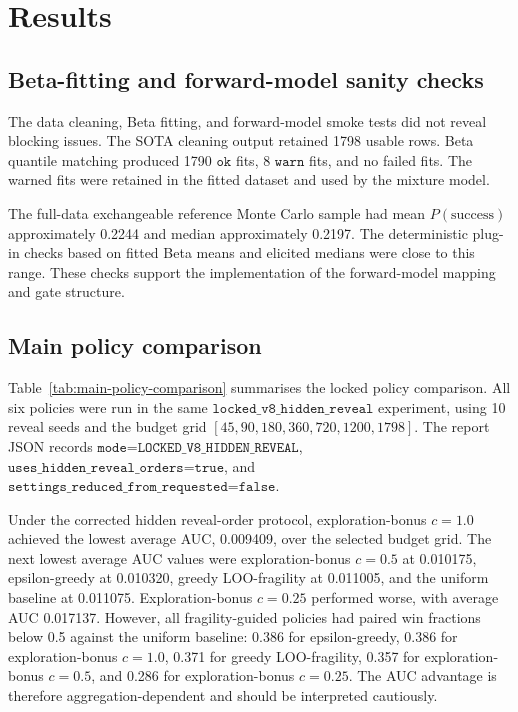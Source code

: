 \documentclass[11pt]{article}
\newcommand{\psuccess}{P(\mathrm{success})}
\begin{document}
\section{Results}

\subsection{Beta-fitting and forward-model sanity checks}

The data cleaning, Beta fitting, and forward-model smoke tests did not reveal blocking issues. The SOTA cleaning output retained 1798 usable rows. Beta quantile matching produced 1790 \(\texttt{ok}\) fits, 8 \(\texttt{warn}\) fits, and no failed fits. The warned fits were retained in the fitted dataset and used by the mixture model.

The full-data exchangeable reference Monte Carlo sample had mean \(\psuccess\) approximately 0.2244 and median approximately 0.2197. The deterministic plug-in checks based on fitted Beta means and elicited medians were close to this range. These checks support the implementation of the forward-model mapping and gate structure.

\subsection{Main policy comparison}

Table~\ref{tab:main-policy-comparison} summarises the locked policy comparison. All six policies were run in the same \(\texttt{locked\_v8\_hidden\_reveal}\) experiment, using 10 reveal seeds and the budget grid \([45,90,180,360,720,1200,1798]\). The report JSON records \(\texttt{mode=LOCKED\_V8\_HIDDEN\_REVEAL}\), \(\texttt{uses\_hidden\_reveal\_orders=true}\), and \(\texttt{settings\_reduced\_from\_requested=false}\).



Under the corrected hidden reveal-order protocol, exploration-bonus \(c=1.0\) achieved the lowest average AUC, 0.009409, over the selected budget grid. The next lowest average AUC values were exploration-bonus \(c=0.5\) at 0.010175, epsilon-greedy at 0.010320, greedy LOO-fragility at 0.011005, and the uniform baseline at 0.011075. Exploration-bonus \(c=0.25\) performed worse, with average AUC 0.017137. However, all fragility-guided policies had paired win fractions below 0.5 against the uniform baseline: 0.386 for epsilon-greedy, 0.386 for exploration-bonus \(c=1.0\), 0.371 for greedy LOO-fragility, 0.357 for exploration-bonus \(c=0.5\), and 0.286 for exploration-bonus \(c=0.25\). The AUC advantage is therefore aggregation-dependent and should be interpreted cautiously.
\end{document}
